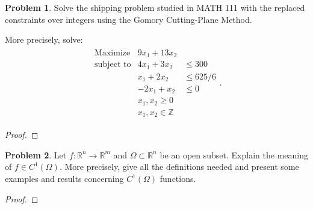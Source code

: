 \documentclass[12pt]{article}
\theoremstyle{definition}
\newtheorem{problem}{Problem}
\begin{document}
\begin{problem}
  Solve the shipping problem studied in MATH 111 with the replaced constraints over integers using the
  Gomory Cutting-Plane Method.

  More precisely, solve:
  \begin{align*}
    \begin{array}{lll}
      \text{Maximize} & 9x_1 + 13x_2 & \\
      \text{subject to} & 4x_1 + 3x_2 &\leq 300 \\
       & x_1 + 2x_2 &\leq 625/6 \\
       & -2x_1 + x_2 &\leq 0 \\
       & x_1, x_2 \geq 0 & \\
       & x_1, x_2 \in \mathbb{Z}&
    \end{array}.
  \end{align*}
\end{problem}

\begin{proof}
\end{proof}
\newpage


\begin{problem}
  Let $f:\mathbb{R}^n \to \mathbb{R}^m$ and $\Omega \subset \mathbb{R}^n$ be an open subset.
  Explain the meaning of $f\in C^1(\Omega)$. More precisely, give all the definitions needed and present some examples
  and results concerning $C^1(\Omega)$ functions.
\end{problem}

\begin{proof}
\end{proof}
\newpage
\end{document}
